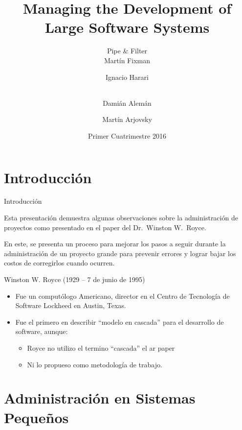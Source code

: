 \documentclass{beamer}
\title{Managing the Development of Large Software Systems}
\author[Pipe \& Filter]{%
	{\Large Pipe \& Filter} \\ \vspace{1em}
	Martín Fixman\inst{1} \and
	Ignacio Harari\inst{1} \and \\
	Damián Alemán\inst{1} \and
	Martín Arjovsky\inst{1}
}
\institute{\inst{1} Facultad de Ciencias Exactas y Naturales}
\date{Primer Cuatrimestre 2016}
\begin{document}
\begin{frame}[fragile]
\titlepage{}
\end{frame}

\section{Introducción}

\begin{frame}[fragile]{Introducción}

Esta presentación demuestra algunas observaciones sobre la administración de proyectos como presentado en el paper del {\large Dr.\ Winston W.\ Royce}\cite{royce70}.

\bigskip

En este, se presenta un proceso para mejorar los pasos a seguir durante la administración de un proyecto grande para prevenir errores y lograr bajar los costos de corregirlos cuando ocurren.

\end{frame}

\begin{frame}
Winston W. Royce (1929 – 7 de junio de 1995)

\begin{itemize}

\item Fue un computólogo Americano, director en el Centro de Tecnología de Software Lockheed en Austin, Texas.

\item Fue el primero en describir ``modelo en cascada'' para el desarrollo de software, aunque: 
\begin{itemize}
\item Royce no utilizo el termino ``cascada'' el ar paper
\item Ni lo propueso como metodología de trabajo.
\end{itemize}
\end{itemize}

\end{frame}

\section{Administración en Sistemas Pequeños}
\end{document}
